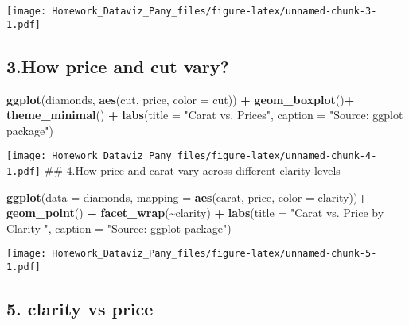 \documentclass[
]{article}
\newenvironment{Shaded}{\begin{snugshade}}{\end{snugshade}}
\newcommand{\AttributeTok}[1]{\textcolor[rgb]{0.13,0.29,0.53}{#1}}
\newcommand{\FunctionTok}[1]{\textcolor[rgb]{0.13,0.29,0.53}{\textbf{#1}}}
\newcommand{\NormalTok}[1]{#1}
\newcommand{\SpecialCharTok}[1]{\textcolor[rgb]{0.81,0.36,0.00}{\textbf{#1}}}
\newcommand{\StringTok}[1]{\textcolor[rgb]{0.31,0.60,0.02}{#1}}
\begin{document}
\texttt{[image: Homework\_Dataviz\_Pany\_files/figure-latex/unnamed-chunk-3-1.pdf]}

\subsection{3.How price and cut vary?}\label{how-price-and-cut-vary}

\begin{Shaded}
\begin{Highlighting}[]
\FunctionTok{ggplot}\NormalTok{(diamonds,}
        \FunctionTok{aes}\NormalTok{(cut, price, }\AttributeTok{color =}\NormalTok{ cut)) }\SpecialCharTok{+}
        \FunctionTok{geom\_boxplot}\NormalTok{()}\SpecialCharTok{+}
        \FunctionTok{theme\_minimal}\NormalTok{() }\SpecialCharTok{+}
        \FunctionTok{labs}\NormalTok{(}\AttributeTok{title =} \StringTok{"Carat vs. Prices"}\NormalTok{,}
             \AttributeTok{caption =} \StringTok{"Source: ggplot package"}\NormalTok{)}
\end{Highlighting}
\end{Shaded}

\texttt{[image: Homework\_Dataviz\_Pany\_files/figure-latex/unnamed-chunk-4-1.pdf]}
\#\# 4.How price and carat vary across different clarity levels

\begin{Shaded}
\begin{Highlighting}[]
\FunctionTok{ggplot}\NormalTok{(}\AttributeTok{data =}\NormalTok{ diamonds,}
       \AttributeTok{mapping =} \FunctionTok{aes}\NormalTok{(carat, price, }\AttributeTok{color =}\NormalTok{ clarity))}\SpecialCharTok{+} 
       \FunctionTok{geom\_point}\NormalTok{() }\SpecialCharTok{+}
       \FunctionTok{facet\_wrap}\NormalTok{(}\SpecialCharTok{\textasciitilde{}}\NormalTok{clarity) }\SpecialCharTok{+}
       \FunctionTok{labs}\NormalTok{(}\AttributeTok{title =} \StringTok{"Carat vs. Price by Clarity "}\NormalTok{,}
            \AttributeTok{caption =} \StringTok{"Source: ggplot package"}\NormalTok{)}
\end{Highlighting}
\end{Shaded}

\texttt{[image: Homework\_Dataviz\_Pany\_files/figure-latex/unnamed-chunk-5-1.pdf]}

\subsection{5. clarity vs price}\label{clarity-vs-price}
\end{document}
